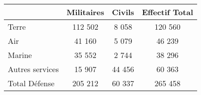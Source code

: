 \documentclass{standalone}
\begin{document}
	\begin{tabularx}{0.8\textwidth}{X|c|c|c|}
		\cline{2-4}
		 & Militaires\cellcolor{maincolor} & Civils\cellcolor{maincolor} & Effectif Total\cellcolor{maincolor}\\
		\hline
		\multicolumn{1}{|l|}{Terre}                              & 112 502                      & 8 058                       & 120 560\\
		\hline
		\multicolumn{1}{|l|}{Air}                                & 41 160                       & 5 079                       & 46 239\\
		\hline
		\multicolumn{1}{|l|}{Marine}                             & 35 552                       & 2 744                       & 38 296\\
		\hline
		\multicolumn{1}{|l|}{Autres services}                    & 15 907                       & 44 456                      & 60 363\\
		\hline
		\multicolumn{1}{|l|}{Total Défense\cellcolor{maincolor}} & 205 212\cellcolor{maincolor} & 60 337\cellcolor{maincolor} & 265 458\cellcolor{maincolor}\\
		\hline
	\end{tabularx}
\end{document}

